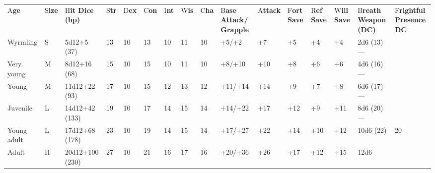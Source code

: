 \documentclass{article}
\begin{document}
\vspace{12pt}
\begin{tabular}{|>{\raggedright}p{18pt}|>{\raggedright}p{6pt}|>{\raggedright}p{18pt}|>{\raggedright}p{4pt}|>{\raggedright}p{5pt}|>{\raggedright}p{6pt}|>{\raggedright}p{4pt}|>{\raggedright}p{5pt}|>{\raggedright}p{6pt}|>{\raggedright}p{14pt}|>{\raggedright}p{10pt}|>{\raggedright}p{8pt}|>{\raggedright}p{8pt}|>{\raggedright}p{8pt}|>{\raggedright}p{16pt}|>{\raggedright}p{17pt}|}
\hline
\multicolumn{16}{|p{158pt}|}{G\textbf{reen Dragons by Age}}\tabularnewline
\hline
A{\small{}\textbf{ge}} & S{\small{}\textbf{ize}} & H{\small{}\textbf{it Dice (hp)}} & S{\small{}\textbf{tr}} & D{\small{}\textbf{ex}} & C{\small{}\textbf{on}} & I{\small{}\textbf{nt}} & W{\small{}\textbf{is}} & C{\small{}\textbf{ha}} & B{\small{}\textbf{ase 
Attack/}}\linebreak{}
{\small{}\textbf{Grapple}} & A{\small{}\textbf{ttack}} & F{\small{}\textbf{ort 
Save}} & R{\small{}\textbf{ef Save}} & W{\small{}\textbf{ill Save}} & B{\small{}\textbf{reath 
Weapon (DC)}} & F{\small{}\textbf{rightful Presence DC}}\tabularnewline
\hline
W{\small{}yrmling} & S & 5{\small{}d12+5 (37)} & 1{\small{}3} & 1{\small{}0} & 1{\small{}3} & 1{\small{}0} & 1{\small{}1} & 1{\small{}0} & +{\small{}5/+2} & +{\small{}7} & +{\small{}5} & +{\small{}4} & +{\small{}4} & 2{\small{}d6 
(13)}--- & \tabularnewline
\hline
V{\small{}ery young} & M & 8{\small{}d12+16 (68)} & 1{\small{}5} & 1{\small{}0} & 1{\small{}5} & 1{\small{}0} & 1{\small{}1} & 1{\small{}0} & +{\small{}8/+10} & +{\small{}10} & +{\small{}8} & +{\small{}6} & +{\small{}6} & 4{\small{}d6 
(16)}--- & \tabularnewline
\hline
Y{\small{}oung} & M & 1{\small{}1d12+22 (93)} & 1{\small{}7} & 1{\small{}0} & 1{\small{}5} & 1{\small{}2} & 1{\small{}3} & 1{\small{}2} & +{\small{}11/+14} & +{\small{}14} & +{\small{}9} & +{\small{}7} & +{\small{}8} & 6{\small{}d6 
(17)}--- & \tabularnewline
\hline
J{\small{}uvenile} & L & 1{\small{}4d12+42 (133)} & 1{\small{}9} & 1{\small{}0} & 1{\small{}7} & 1{\small{}4} & 1{\small{}5} & 1{\small{}4} & +{\small{}14/+22} & +{\small{}17} & +{\small{}12} & +{\small{}9} & +{\small{}11} & 8{\small{}d6 
(20)}--- & \tabularnewline
\hline
Y{\small{}oung adult} & L & 1{\small{}7d12+68 (178)} & 2{\small{}3} & 1{\small{}0} & 1{\small{}9} & 1{\small{}4} & 1{\small{}5} & 1{\small{}4} & +{\small{}17/+27} & +{\small{}22} & +{\small{}14} & +{\small{}10} & +{\small{}12} & 1{\small{}0d6 
(22)} & 2{\small{}0}\tabularnewline
\hline
A{\small{}dult} & H & 2{\small{}0d12+100 (230)} & 2{\small{}7} & 1{\small{}0} & 2{\small{}1} & 1{\small{}6} & 1{\small{}7} & 1{\small{}6} & +{\small{}20/+36} & +{\small{}26} & +{\small{}17} & +{\small{}12} & +{\small{}15} & 1{\small{}2d6 
}
\end{tabular}
\end{document}
